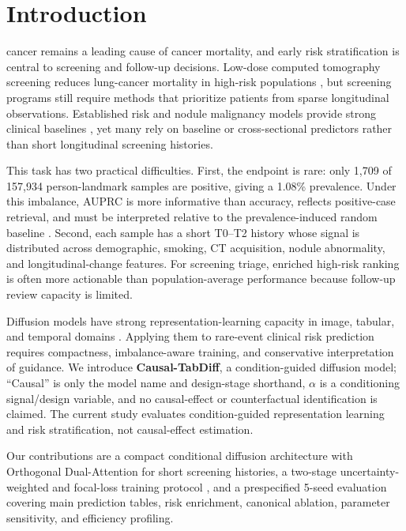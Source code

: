 \documentclass[11pt,journal,twoside]{IEEEtran}
\begin{document}
\section{Introduction}
\label{sec:introduction}
 cancer remains a leading cause of cancer mortality, and early risk stratification is central to screening and follow-up decisions. Low-dose computed tomography screening reduces lung-cancer mortality in high-risk populations \cite{nlst2011,deKoning2020nelson}, but screening programs still require methods that prioritize patients from sparse longitudinal observations. Established risk and nodule malignancy models provide strong clinical baselines \cite{bach2003risk,tammemagi2013,mcwilliams2013,kovalchik2013risk,katki2018models}, yet many rely on baseline or cross-sectional predictors rather than short longitudinal screening histories.

This task has two practical difficulties. First, the endpoint is rare: only 1,709 of 157,934 person-landmark samples are positive, giving a 1.08\% prevalence. Under this imbalance, AUPRC is more informative than accuracy, reflects positive-case retrieval, and must be interpreted relative to the prevalence-induced random baseline \cite{davis2006prroc,saito2015,he2009imbalanced}. Second, each sample has a short T0--T2 history whose signal is distributed across demographic, smoking, CT acquisition, nodule abnormality, and longitudinal-change features. For screening triage, enriched high-risk ranking is often more actionable than population-average performance because follow-up review capacity is limited.

Diffusion models have strong representation-learning capacity in image, tabular, and temporal domains \cite{ho2020ddpm,nichol2021improved,song2021sde,kotelnikov2023tabddpm,tashiro2021csdi}. Applying them to rare-event clinical risk prediction requires compactness, imbalance-aware training, and conservative interpretation of guidance. We introduce \textbf{Causal-TabDiff}, a condition-guided diffusion model; ``Causal'' is only the model name and design-stage shorthand, $\alpha$ is a conditioning signal/design variable, and no causal-effect or counterfactual identification is claimed. The current study evaluates condition-guided representation learning and risk stratification, not causal-effect estimation.

Our contributions are a compact conditional diffusion architecture with Orthogonal Dual-Attention for short screening histories, a two-stage uncertainty-weighted and focal-loss training protocol \cite{kendall2018uncertainty,lin2017focal}, and a prespecified 5-seed evaluation covering main prediction tables, risk enrichment, canonical ablation, parameter sensitivity, and efficiency profiling.
\end{document}
